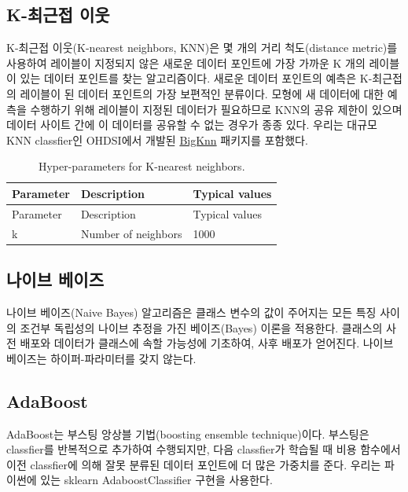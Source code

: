 \documentclass[11pt]{book}
\theoremstyle{definition}
\theoremstyle{definition}
\theoremstyle{definition}
\theoremstyle{remark}
\begin{document}
\subsection{K-최근접 이웃}\label{k--}

K-최근접 이웃(K-nearest neighbors, KNN)은 몇 개의 거리 척도(distance
metric)를 사용하여 레이블이 지정되지 않은 새로운 데이터 포인트에 가장
가까운 K 개의 레이블이 있는 데이터 포인트를 찾는 알고리즘이다. 새로운
데이터 포인트의 예측은 K-최근접의 레이블이 된 데이터 포인트의 가장
보편적인 분류이다. 모형에 새 데이터에 대한 예측을 수행하기 위해 레이블이
지정된 데이터가 필요하므로 KNN의 공유 제한이 있으며 데이터 사이트 간에
이 데이터를 공유할 수 없는 경우가 종종 있다. 우리는 대규모 KNN
classfier인 OHDSI에서 개발된
\href{https://github.com/OHDSI/BigKnn}{BigKnn} 패키지를 포함했다.
 

\begin{longtable}[]{@{}lll@{}}
\caption{\label{tab:knnParameters} Hyper-parameters for K-nearest
neighbors.}\tabularnewline
\toprule
Parameter & Description & Typical values\tabularnewline
\midrule
\endfirsthead
\toprule
Parameter & Description & Typical values\tabularnewline
\midrule
\endhead
k & Number of neighbors & 1000\tabularnewline
\bottomrule
\end{longtable}

\subsection{나이브 베이즈}\label{-}

나이브 베이즈(Naive Bayes) 알고리즘은 클래스 변수의 값이 주어지는 모든
특징 사이의 조건부 독립성의 나이브 추정을 가진 베이즈(Bayes) 이론을
적용한다. 클래스의 사전 배포와 데이터가 클래스에 속할 가능성에 기초하여,
사후 배포가 얻어진다. 나이브 베이즈는 하이퍼-파라미터를 갖지 않는다.

\subsection{AdaBoost}\label{adaboost}

AdaBoost는 부스팅 앙상블 기법(boosting ensemble technique)이다. 부스팅은
classfier를 반복적으로 추가하여 수행되지만, 다음 classfier가 학습될 때
비용 함수에서 이전 classfier에 의해 잘못 분류된 데이터 포인트에 더 많은
가중치를 준다. 우리는 파이썬에 있는 sklearn AdaboostClassifier 구현을
사용한다.  
\end{document}
